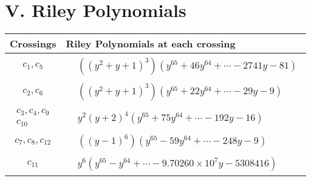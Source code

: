 \documentclass[1p]{elsarticle_modified}
\theoremstyle{definition}
\begin{document}
\centering \section*{ V. Riley Polynomials}
\begin{tabular}{m{50pt}|m{274pt}}
Crossings & \hspace{64pt}Riley Polynomials at each crossing \\
\hline $$\begin{aligned}c_{1},c_{5}\end{aligned}$$&$\begin{aligned}
&((y^2+y+1)^3)(y^{65}+46 y^{64}+\cdots-2741 y-81)
\end{aligned}$\\
\hline $$\begin{aligned}c_{2},c_{6}\end{aligned}$$&$\begin{aligned}
&((y^2+y+1)^3)(y^{65}+22 y^{64}+\cdots-29 y-9)
\end{aligned}$\\
\hline $$\begin{aligned}c_{3},c_{4},c_{9}\\c_{10}\end{aligned}$$&$\begin{aligned}
&y^2(y+2)^4(y^{65}+75 y^{64}+\cdots-192 y-16)
\end{aligned}$\\
\hline $$\begin{aligned}c_{7},c_{8},c_{12}\end{aligned}$$&$\begin{aligned}
&((y-1)^6)(y^{65}-59 y^{64}+\cdots-248 y-9)
\end{aligned}$\\
\hline $$\begin{aligned}c_{11}\end{aligned}$$&$\begin{aligned}
&y^6(y^{65}-y^{64}+\cdots-9.70260\times10^{7} y-5308416)
\end{aligned}$\\
\hline
\end{tabular}
\vskip 2pc
\end{document}
